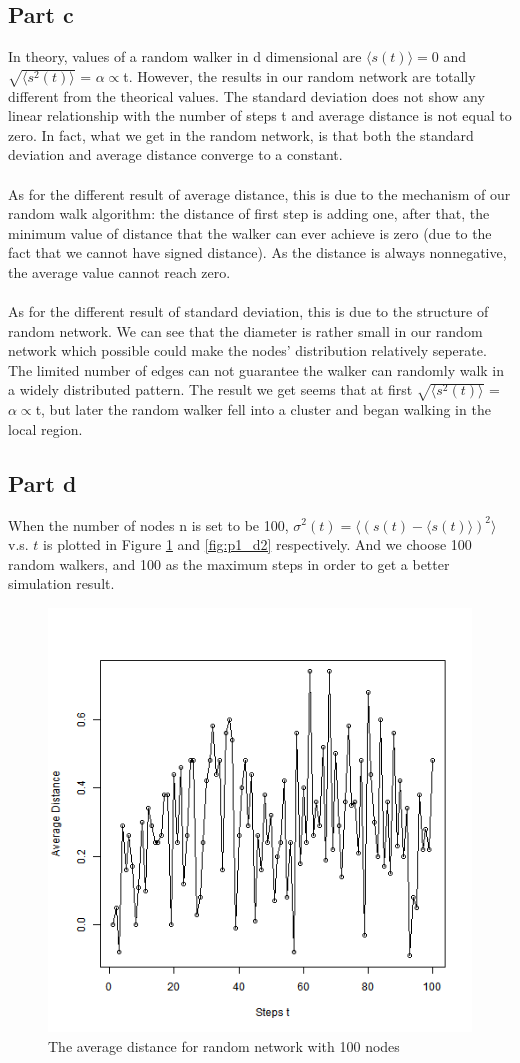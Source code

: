 \documentclass{article}
\begin{document}
\subsection{Part c}
In theory, values of a random walker in d dimensional are $\langle s(t)\rangle=0$ and$\sqrt{\langle s^2(t)\rangle}$ = $\alpha \propto $t. However, the results in our random network are totally different from the theorical values. The standard deviation does not show any linear relationship with the number of steps t and average distance is not equal to zero. In fact, what we get in the random network, is that both the standard deviation and average distance converge to a constant.\\
\\
As for the different result of average distance, this is due to the mechanism of our random walk algorithm: the distance of first step is adding one, after that, the minimum value of distance that the walker can ever achieve is zero (due to the fact that we cannot have signed distance). As the distance is always nonnegative, the average value cannot reach zero.\\
\\
As for the different result of standard deviation, this is due to the structure of random network. We can see that the diameter is rather small in our random network which possible could make the nodes' distribution relatively seperate. The limited number of edges can not guarantee the walker can randomly walk in a widely distributed pattern. The result we get seems that at first $\sqrt{\langle s^2(t)\rangle}$ = $\alpha \propto $t, but later the random walker fell into a cluster and began walking in the local region.

\subsection{Part d}
When the number of nodes n is set to be 100, $\sigma^2(t)=\langle (s(t)-\langle s(t)\rangle)^2\rangle$ v.s. $t$ is plotted in Figure \ref{fig:p1_d1} and \ref{fig:p1_d2} respectively. And we choose 100 random walkers, and 100 as the maximum steps in order to get a better simulation result.
\begin{figure}[htbp]
\centering
\includegraphics[width=.6\textwidth]{Q1d_1_100.png}
\caption{The average distance for random network with 100 nodes}
\label{fig:p1_d1}
\end{figure}
\end{document}
